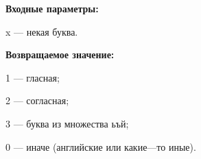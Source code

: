 \textbf{Входные параметры:}

x --- некая буква.

\textbf{Возвращаемое значение:}

    1 --- гласная;
 
    2 --- согласная;
 
    3 --- буква из множества ьъй;
 
    0 --- иначе (английские или какие---то иные).